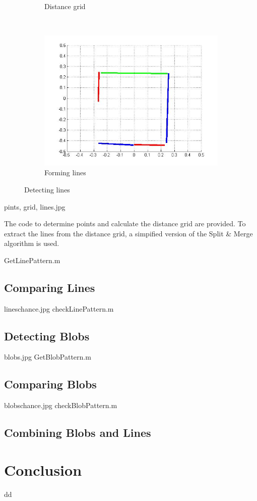 \documentclass[12pt]{article}
\begin{document}
\begin{figure}[h!]
\begin{subfigure}[b]{0.3\textwidth}
            \caption{Distance grid}
            \label{fig:grid}
    \end{subfigure}
    ~
    \begin{subfigure}[b]{0.3\textwidth}
            \includegraphics[width=\textwidth]{lines.jpg}
            \caption{Forming lines}
            \label{fig:lines}
    \end{subfigure}
    \caption{Detecting lines}
\end{figure}
pints, grid, lines.jpg

The code to determine points and calculate the distance grid are provided. To extract the lines from the distance grid, a simpified version of the Split \& Merge algorithm is used. 

GetLinePattern.m
 
\subsection{Comparing Lines}
lineschance.jpg
checkLinePattern.m

\subsection{Detecting Blobs}
blobs.jpg
GetBlobPattern.m

\subsection{Comparing Blobs}
blobschance.jpg
checkBlobPattern.m

\subsection{Combining Blobs and Lines}
\section{Conclusion}
dd
\end{document}
